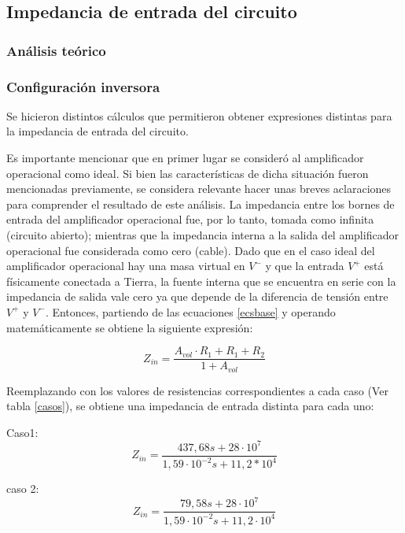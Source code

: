 \subsection{Impedancia de entrada del circuito} %


\subsubsection{An\'alisis te\'orico} %

\subsubsection*{Configuraci\'on inversora}
Se hicieron distintos c\'alculos que permitieron obtener expresiones distintas para la impedancia de entrada del circuito.

Es importante mencionar que en primer lugar se consider\'o al amplificador operacional como ideal. Si bien las caracter\'isticas de dicha situaci\'on fueron mencionadas previamente, se considera relevante hacer unas breves aclaraciones para comprender el resultado de este an\'alisis. La impedancia entre los bornes de entrada del amplificador operacional fue, por lo tanto, tomada como infinita (circuito abierto); mientras que la impedancia interna a la salida del amplificador operacional fue considerada como cero (cable). Dado que en el caso ideal del amplificador operacional hay una masa virtual en $V^-$ y que la entrada $V^+$ est\'a f\'isicamente conectada a Tierra, la fuente interna que se encuentra en serie con la impedancia de salida vale cero ya que depende de la diferencia de tensi\'on entre $V^+$ y $V^-$. Entonces, partiendo de las ecuaciones \ref{ecsbase} y operando matem\'aticamente se obtiene la siguiente expresi\'on:

\begin{equation}
	Z_{in} =  \frac{A_{vol} \cdot R_1 + R_1 + R_2}{1 + A_{vol}}
	\label{zint}
\end{equation}

Reemplazando con los valores de resistencias correspondientes a cada caso (Ver tabla \ref{casos}), se obtiene una impedancia de entrada distinta para cada uno:

Caso1:
\begin{equation}
	Z_{in} =  \frac{437,68 s + 28 \cdot 10^7}{1,59 \cdot 10^{-2} s + 11,2 * 10^4}
	\label{c1c1zint}
\end{equation}

caso 2:
\begin{equation}
	Z_{in} =  \frac{79,58 s + 28 \cdot 10^7}{1,59 \cdot 10^{-2} s + 11,2 \cdot 10^4}
	\label{c1c2zint}
\end{equation}

